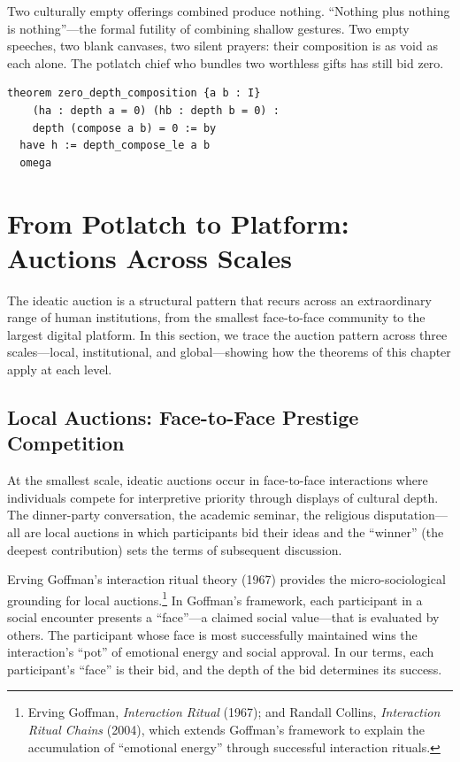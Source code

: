 Two culturally empty offerings combined produce nothing.  ``Nothing plus
nothing is nothing''---the formal futility of combining shallow gestures.
Two empty speeches, two blank canvases, two silent prayers: their
composition is as void as each alone.  The potlatch chief who bundles
two worthless gifts has still bid zero.

\begin{lstlisting}[caption={Depth-zero composition in Lean~4}]
theorem zero_depth_composition {a b : I}
    (ha : depth a = 0) (hb : depth b = 0) :
    depth (compose a b) = 0 := by
  have h := depth_compose_le a b
  omega
\end{lstlisting}

\section{From Potlatch to Platform: Auctions Across Scales}
\label{sec:ch14-across-scales}

The ideatic auction is a structural pattern that recurs across an
extraordinary range of human institutions, from the smallest face-to-face
community to the largest digital platform.  In this section, we trace the
auction pattern across three scales---local, institutional, and
global---showing how the theorems of this chapter apply at each level.

\subsection{Local Auctions: Face-to-Face Prestige Competition}

At the smallest scale, ideatic auctions occur in face-to-face interactions
where individuals compete for interpretive priority through displays of
cultural depth.  The dinner-party conversation, the academic seminar, the
religious disputation---all are local auctions in which participants bid
their ideas and the ``winner'' (the deepest contribution) sets the terms
of subsequent discussion.

Erving Goffman's interaction ritual theory (1967) provides the
micro-sociological grounding for local auctions.\footnote{Erving Goffman,
\textit{Interaction Ritual} (1967); and Randall Collins, \textit{Interaction
Ritual Chains} (2004), which extends Goffman's framework to explain the
accumulation of ``emotional energy'' through successful interaction
rituals.}  In Goffman's framework, each participant in a social encounter
presents a ``face''---a claimed social value---that is evaluated by others.
The participant whose face is most successfully maintained wins the
interaction's ``pot'' of emotional energy and social approval.  In our
terms, each participant's ``face'' is their bid, and the depth of the
bid determines its success.


